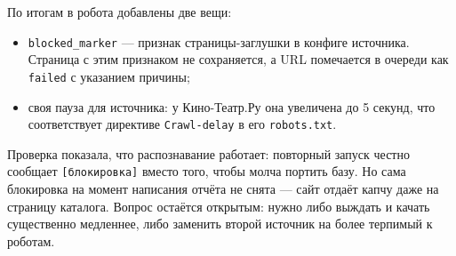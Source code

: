 По итогам в робота добавлены две вещи:
\begin{itemize}
    \item \texttt{blocked\_marker} --- признак страницы-заглушки в конфиге
          источника. Страница с этим признаком не сохраняется, а URL помечается
          в очереди как \texttt{failed} с указанием причины;
    \item своя пауза для источника: у Кино-Театр.Ру она увеличена до 5 секунд,
          что соответствует директиве \texttt{Crawl-delay} в его
          \texttt{robots.txt}.
\end{itemize}

Проверка показала, что распознавание работает: повторный запуск честно сообщает
\texttt{[блокировка]} вместо того, чтобы молча портить базу. Но сама блокировка
на момент написания отчёта не снята --- сайт отдаёт капчу даже на страницу
каталога. Вопрос остаётся открытым: нужно либо выждать и качать существенно
медленнее, либо заменить второй источник на более терпимый к роботам.

\pagebreak
